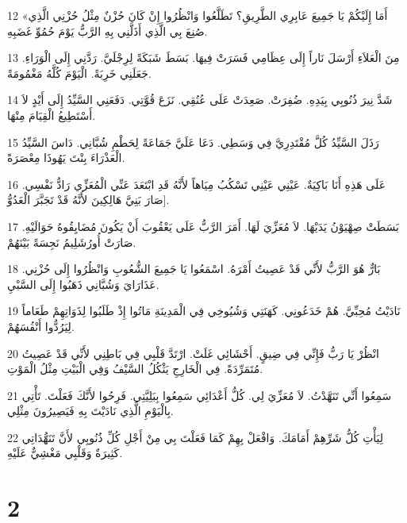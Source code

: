 \par 12 «أَمَا إِلَيْكُمْ يَا جَمِيعَ عَابِرِي الطَّرِيقِ؟ تَطَلَّعُوا وَانْظُرُوا إِنْ كَانَ حُزْنٌ مِثْلُ حُزْنِي الَّذِي صُنِعَ بِي الَّذِي أَذَلَّنِي بِهِ الرَّبُّ يَوْمَ حُمُوِّ غَضَبِهِ.
\par 13 مِنَ الْعَلاَءِ أَرْسَلَ نَاراً إِلَى عِظَامِي فَسَرَتْ فِيهَا. بَسَطَ شَبَكَةً لِرِجْلَيَّ. رَدَّنِي إِلَى الْوَرَاءِ. جَعَلَنِي خَرِبَةً. الْيَوْمَ كُلَّهُ مَغْمُومَةً.
\par 14 شَدَّ نِيرَ ذُنُوبِي بِيَدِهِ. ضُفِرَتْ. صَعِدَتْ عَلَى عُنُقِي. نَزَعَ قُوَّتِي. دَفَعَنِي السَّيِّدُ إِلَى أَيْدٍ لاَ أَسْتَطِيعُ الْقِيَامَ مِنْهَا.
\par 15 رَذَلَ السَّيِّدُ كُلَّ مُقْتَدِرِيَّ فِي وَسَطِي. دَعَا عَلَيَّ جَمَاعَةً لِحَطْمِ شُبَّانِي. دَاسَ السَّيِّدُ الْعَذْرَاءَ بِنْتَ يَهُوذَا مِعْصَرَةً.
\par 16 عَلَى هَذِهِ أَنَا بَاكِيَةٌ. عَيْنِي عَيْنِي تَسْكُبُ مِيَاهاً لأَنَّهُ قَدِ ابْتَعَدَ عَنِّي الْمُعَزِّي رَادُّ نَفْسِي. صَارَ بَنِيَّ هَالِكِينَ لأَنَّهُ قَدْ تَجَبَّرَ الْعَدُوُّ].
\par 17 بَسَطَتْ صِهْيَوْنُ يَدَيْهَا. لاَ مُعَزِّيَ لَهَا. أَمَرَ الرَّبُّ عَلَى يَعْقُوبَ أَنْ يَكُونَ مُضَايِقُوهُ حَوَالَيْهِ. صَارَتْ أُورُشَلِيمُ نَجِسَةً بَيْنَهُمْ.
\par 18 بَارٌّ هُوَ الرَّبُّ لأَنِّي قَدْ عَصِيتُ أَمْرَهُ. اسْمَعُوا يَا جَمِيعَ الشُّعُوبِ وَانْظُرُوا إِلَى حُزْنِي. عَذَارَايَ وَشُبَّانِي ذَهَبُوا إِلَى السَّبْيِ.
\par 19 نَادَيْتُ مُحِبِّيَّ. هُمْ خَدَعُونِي. كَهَنَتِي وَشُيُوخِي فِي الْمَدِينَةِ مَاتُوا إِذْ طَلَبُوا لِذَوَاتِهِمْ طَعَاماً لِيَرُدُّوا أَنْفُسَهُمْ.
\par 20 انْظُرْ يَا رَبُّ فَإِنِّي فِي ضِيقٍ. أَحْشَائِي غَلَتْ. ارْتَدَّ قَلْبِي فِي بَاطِنِي لأَنِّي قَدْ عَصِيتُ مُتَمَرِّدَةً. فِي الْخَارِجِ يَثْكُلُ السَّيْفُ وَفِي الْبَيْتِ مِثْلُ الْمَوْتِ.
\par 21 سَمِعُوا أَنِّي تَنَهَّدْتُ. لاَ مُعَزِّيَ لِي. كُلُّ أَعْدَائِي سَمِعُوا بِبَلِيَّتِي. فَرِحُوا لأَنَّكَ فَعَلْتَ. تَأْتِي بِالْيَوْمِ الَّذِي نَادَيْتَ بِهِ فَيَصِيرُونَ مِثْلِي.
\par 22 لِيَأْتِ كُلُّ شَرِّهِمْ أَمَامَكَ. وَافْعَلْ بِهِمْ كَمَا فَعَلْتَ بِي مِنْ أَجْلِ كُلِّ ذُنُوبِي لأَنَّ تَنَهُّدَاتِي كَثِيرَةٌ وَقَلْبِي مَغْشِيٌّ عَلَيْهِ.

\chapter{2}

